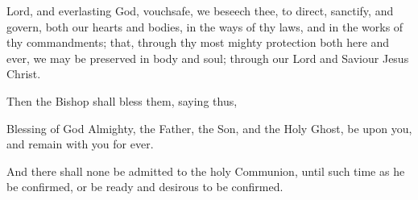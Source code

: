  Lord, and everlasting God, vouchsafe, we beseech thee, to direct, sanctify, and govern, both our hearts and bodies, in the ways of thy laws, and in the works of thy commandments; that, through thy most mighty protection both here and ever, we may be preserved in body and soul; through our Lord and Saviour Jesus Christ.

\begin{rubric}
Then the Bishop shall bless them, saying thus,
\end{rubric}

 Blessing of God Almighty, the Father, the Son, and the Holy Ghost, be upon you, and remain with you for ever.

\begin{rubric}
And there shall none be admitted to the holy Communion, until such time as he be confirmed, or be ready and desirous to be confirmed.
\end{rubric}
